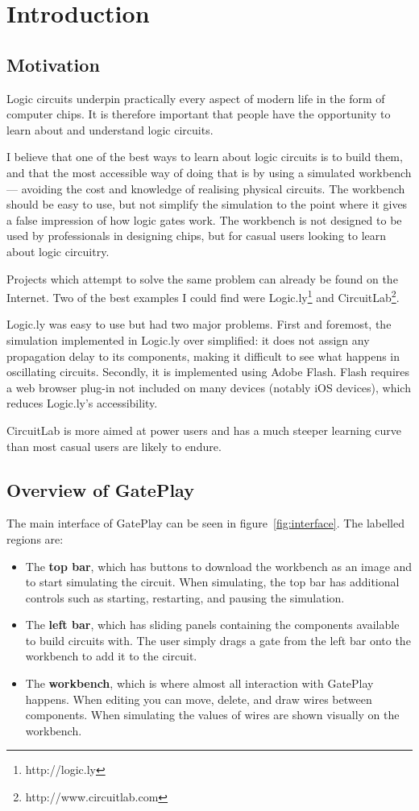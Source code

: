 \chapter{Introduction}

\section{Motivation}
Logic circuits underpin practically every aspect of modern life in the form of computer chips. It is therefore important that people have the opportunity to learn about and understand logic circuits.

I believe that one of the best ways to learn about logic circuits is to build them, and that the most accessible way of doing that is by using a simulated workbench --- avoiding the cost and knowledge of realising physical circuits. The workbench should be easy to use, but not simplify the simulation to the point where it gives a false impression of how logic gates work. The workbench is not designed to be used by professionals in designing chips, but for casual users looking to learn about logic circuitry.

Projects which attempt to solve the same problem can already be found on the Internet. Two of the best examples I could find were Logic.ly\footnote{http://logic.ly} and CircuitLab\footnote{http://www.circuitlab.com}.

Logic.ly was easy to use but had two major problems. First and foremost, the simulation implemented in Logic.ly over simplified: it does not assign any propagation delay to its components, making it difficult to see what happens in oscillating circuits. Secondly, it is implemented using Adobe Flash. Flash requires a web browser plug-in not included on many devices (notably iOS devices), which reduces Logic.ly's accessibility.

CircuitLab is more aimed at power users and has a much steeper learning curve than most casual users are likely to endure.

\section{Overview of GatePlay}
The main interface of GatePlay can be seen in figure~\ref{fig:interface}. The labelled regions are:

\begin{itemize}
	\item[1] The \textbf{top bar}, which has buttons to download the workbench as an image and to start simulating the circuit. When simulating, the top bar has additional controls such as starting, restarting, and pausing the simulation.
	\item[2] The \textbf{left bar}, which has sliding panels containing the  components available to build circuits with. The user simply drags a gate from the left bar onto the workbench to add it to the circuit.
	\item[3] The \textbf{workbench}, which is where almost all interaction with GatePlay happens. When editing you can move, delete, and draw wires between components. When simulating the values of wires are shown visually on the workbench.
\end{itemize}

